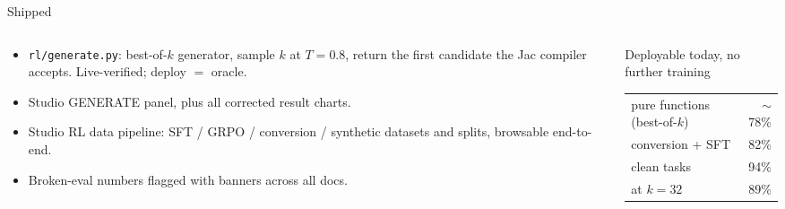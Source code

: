 \documentclass[aspectratio=169,10pt]{beamer}
\begin{document}
\begin{frame}{Shipped}
  \begin{columns}[T]
    \begin{column}{0.52\textwidth}
      \small
      \begin{itemize}\itemsep0.7em
        \item \texttt{rl/generate.py}: best-of-$k$ generator, sample $k$ at $T{=}0.8$, return the first candidate the Jac compiler accepts. Live-verified; deploy $=$ oracle.
        \item Studio GENERATE panel, plus all corrected result charts.
        \item Studio RL data pipeline: SFT / GRPO / conversion / synthetic datasets and splits, browsable end-to-end.
        \item Broken-eval numbers flagged with banners across all docs.
      \end{itemize}
    \end{column}
    \begin{column}{0.44\textwidth}
      \begin{block}{Deployable today, no further training}
        \small
        \begin{tabular}{@{}lr@{}}
          pure functions (best-of-$k$) & $\sim$78\% \\
          conversion + SFT & 82\% \\
          clean tasks & 94\% \\
          at $k=32$ & 89\% \\
        \end{tabular}
      \end{block}
    \end{column}
  \end{columns}
\end{frame}
\end{document}
